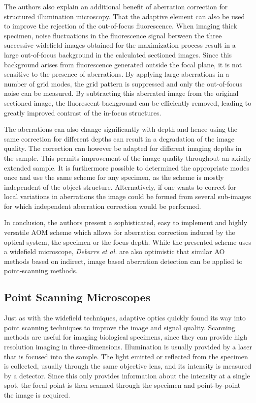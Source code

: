 The authors also explain an additional benefit of aberration correction for structured illumination microscopy. That the adaptive element can also be used to improve the rejection of the out-of-focus fluorescence. When imaging thick specimen, noise fluctuations in the fluorescence signal between the three successive widefield images obtained for the maximization process result in a large out-of-focus background in the calculated sectioned images. Since this background arises from fluorescence generated outside the focal plane, it is not  sensitive to the presence of aberrations. By applying large aberrations in a number of grid modes, the grid pattern is suppressed and only the out-of-focus noise can be measured. By subtracting this aberrated image from the original sectioned image, the fluorescent background can be efficiently removed, leading to greatly improved contrast of the in-focus structures.

The aberrations can also change significantly with depth and hence using the same correction for different depths can result in a degradation of the image quality.  The correction can however be adapted for different imaging depths in the sample. This permits improvement of the image quality throughout an axially extended sample.
It is furthermore possible to determined the appropriate modes once and use the same scheme for any specimen, as the scheme is mostly independent of the object structure. Alternatively, if one wants to correct for local variations in aberrations the image could be formed from several sub-images for which independent aberration correction would be performed.

In conclusion, the authors present a sophisticated, easy to implement and highly versatile AOM scheme which allows for aberration correction induced by the optical system, the specimen or the focus depth. While the presented scheme uses a widefield microscope, \emph{Debarre et al.} are also optimistic that similar AO methods based on indirect, image based aberration detection can be applied to point-scanning methods. 


\subsection{Point Scanning Microscopes}
\label{sec:PointScanningMicroscopes}

Just as with the widefield techniques, adaptive optics quickly found its way into point scanning techniques to improve the image and signal quality. Scanning methods are useful for imaging biological specimens, since they can provide high resolution imaging in three-dimensions. Illumination is usually provided by a laser that is focused into the sample. The light emitted or reflected from the specimen is collected, usually through the same objective lens, and its intensity is measured by a detector. Since this only provides information about the intensity at a single spot, the focal point is then scanned through the specimen and point-by-point the image is acquired. 

